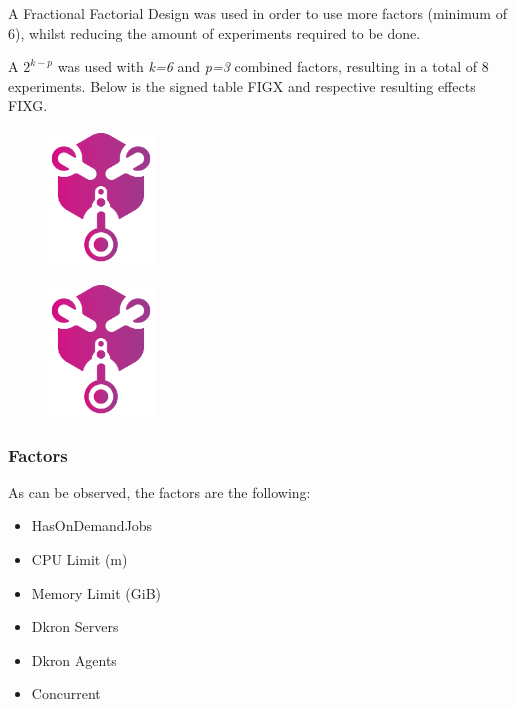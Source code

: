 \documentclass[runningheads]{llncs}
\begin{document}
A Fractional Factorial Design was used in order to use more factors (minimum of 6), whilst reducing
the amount of experiments required to be done.

A $2^{k-p}$ was used with \textit{k=6} and \textit{p=3} combined factors, resulting
in a total of 8 experiments. Below is the signed table FIGX and respective resulting effects FIXG.

\begin{figure}
\centering
\includegraphics[width=0.25\textwidth]{media/dkron-logo.png}
\end{figure}

\begin{figure}
\centering
\includegraphics[width=0.25\textwidth]{media/dkron-logo.png}
\end{figure}



\subsubsection{Factors}
As can be observed, the factors are the following:
\begin{itemize}
    \item HasOnDemandJobs
    \item CPU Limit (m)
    \item Memory Limit (GiB)
    \item Dkron Servers
    \item Dkron Agents
    \item Concurrent
\end{itemize}
\end{document}
